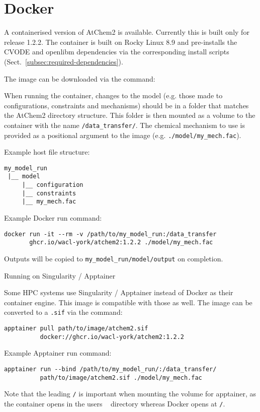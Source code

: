 \section{Docker} \label{sec:docker}

A containerised version of AtChem2 is available. Currently this is
built only for release 1.2.2. The container is built on Rocky Linux
8.9 and pre-installs the CVODE and openlibm dependencies via the
corresponding install scripts (Sect.~\ref{subsec:required-dependencies}).

The image can be downloaded via the command:

When running the container, changes to the model (e.g. those made to
configurations, constraints and mechanisms) should be in a folder that
matches the AtChem2 directory structure. This folder is then mounted
as a volume to the container with the name \texttt{/data\_transfer/}.
The chemical mechanism to use is provided as a positional argument to
the image (e.g. \texttt{./model/my\_mech.fac}).

Example host file structure:
\begin{verbatim}
my_model_run
 |__ model
     |__ configuration
     |__ constraints
     |__ my_mech.fac
\end{verbatim}

Example Docker run command:

\begin{verbatim}
docker run -it --rm -v /path/to/my_model_run:/data_transfer
       ghcr.io/wacl-york/atchem2:1.2.2 ./model/my_mech.fac
\end{verbatim}

Outputs will be copied to \texttt{my\_model\_run/model/output} on completion.

Running on Singularity / Apptainer

Some HPC systems use Singularity / Apptainer instead of Docker as
their container engine. This image is compatible with those
as well. The image can be converted to a \texttt{.sif} via the command:

\begin{verbatim}
apptainer pull path/to/image/atchem2.sif
          docker://ghcr.io/wacl-york/atchem2:1.2.2
\end{verbatim}

Example Apptainer run command:

\begin{verbatim}
apptainer run --bind /path/to/my_model_run/:/data_transfer/
          path/to/image/atchem2.sif ./model/my_mech.fac
\end{verbatim}

Note that the leading \texttt{/} is important when mounting the volume
for apptainer, as the container opens in the users \texttt{~}
directory whereas Docker opens at \texttt{/}.
